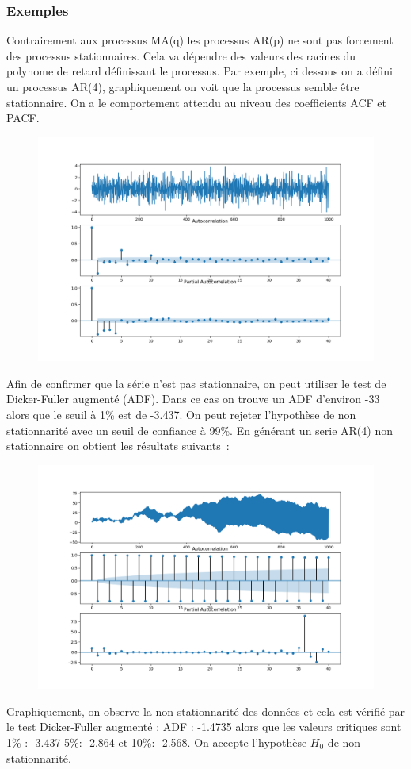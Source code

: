 \documentclass[11pt]{scrartcl} %
\begin{document}
\subsubsection*{Exemples}
Contrairement aux processus MA(q) les processus AR(p) ne sont pas forcement des processus stationnaires. Cela va dépendre des valeurs des racines du polynome de retard définissant le processus.  Par exemple, ci dessous on a défini un processus AR(4), graphiquement on voit que la processus semble être stationnaire.  On a le comportement attendu au niveau des coefficients ACF et PACF.
\begin{figure}[h]
   \includegraphics[scale=.5]{AR4.png}
\end{figure}
Afin de confirmer que la série n'est pas stationnaire, on peut utiliser le test de Dicker-Fuller augmenté (ADF). Dans ce cas on trouve un ADF d'environ -33 alors que le seuil à 1\% est de  -3.437. On peut rejeter l'hypothèse de non stationnarité avec un seuil de confiance à 99\%. 
En générant un serie AR(4) non stationnaire on obtient les résultats suivants~:
\begin{figure}[h]
   \includegraphics[scale=.5]{AR4NS.png}
\end{figure}
Graphiquement, on observe la non stationnarité des données et cela est vérifié par le test Dicker-Fuller augmenté : ADF : -1.4735 alors que les valeurs critiques sont 1\% : -3.437 5\%: -2.864 et 10\%: -2.568. On accepte l'hypothèse $H_0$ de non stationnarité.
\end{document}
